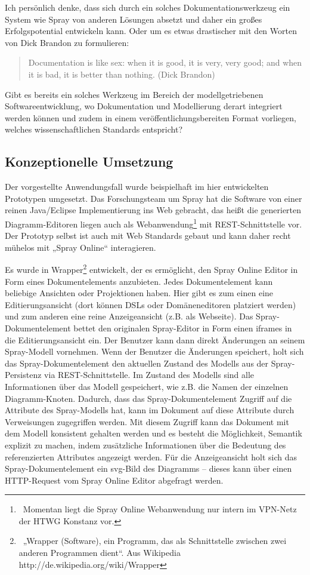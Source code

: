  
Ich persönlich denke, dass sich durch ein solches Dokumentationswerkzeug ein System wie Spray von anderen Lösungen absetzt und daher ein großes Erfolgspotential entwickeln kann. Oder um es etwas drastischer mit den Worten von Dick Brandon zu formulieren:

 
\begin{quote}
 Documentation is like sex: when it is good, it is very, very good; and when it is bad, it is better than nothing. (Dick Brandon)
\end{quote}
 
Gibt es bereits ein solches Werkzeug im Bereich der modellgetriebenen Softwareentwicklung, wo Dokumentation und Modellierung derart integriert werden können und zudem in einem veröffentlichungsbereiten Format vorliegen, welches wissenschaftlichen Standards entspricht?

 
\subsection{Konzeptionelle Umsetzung}\label{}
 
Der vorgestellte Anwendungsfall wurde beispielhaft im hier entwickelten Prototypen umgesetzt. Das Forschungsteam um Spray hat die Software von einer reinen Java/Eclipse Implementierung ins Web gebracht, das heißt die generierten Diagramm-Editoren liegen auch als Webanwendung\footnote{~Momentan liegt die Spray Online Webanwendung nur intern im VPN-Netz der HTWG Konstanz vor.} mit REST-Schnittstelle vor. Der Prototyp selbst ist auch mit Web Standards gebaut und kann daher recht mühelos mit „Spray Online“ interagieren.

 
Es wurde in Wrapper\footnote{~„Wrapper (Software), ein Programm, das als Schnittstelle zwischen zwei anderen Programmen dient“. Aus Wikipedia http://de.wikipedia.org/wiki/Wrapper} entwickelt, der es ermöglicht, den Spray Online Editor in Form eines Dokumentelements anzubieten. Jedes Dokumentelement kann beliebige Ansichten oder Projektionen haben. Hier gibt es zum einen eine Editierungsansicht (dort können DSLs oder Domäneneditoren platziert werden) und zum anderen eine reine Anzeigeansicht (z.B. als Webseite). Das Spray-Dokumentelement bettet den originalen Spray-Editor in Form einen iframes in die Editierungsansicht ein. Der Benutzer kann dann direkt Änderungen an seinem Spray-Modell vornehmen. Wenn der Benutzer die Änderungen speichert, holt sich das Spray-Dokumentelement den aktuellen Zustand des Modells aus der Spray-Persistenz via REST-Schnittstelle. Im Zustand des Modells sind alle Informationen über das Modell gespeichert, wie z.B. die Namen der einzelnen Diagramm-Knoten. Dadurch, dass das Spray-Dokumentelement Zugriff auf die Attribute des Spray-Modells hat, kann im Dokument auf diese Attribute durch Verweisungen zugegriffen werden. Mit diesem Zugriff kann das Dokument mit dem Modell konsistent gehalten werden und es besteht die Möglichkeit, Semantik explizit zu machen, indem zusätzliche Informationen über die Bedeutung des referenzierten Attributes angezeigt werden. Für die Anzeigeansicht holt sich das Spray-Dokumentelement ein svg-Bild des Diagramms -- dieses kann über einen HTTP-Request vom Spray Online Editor abgefragt werden.

